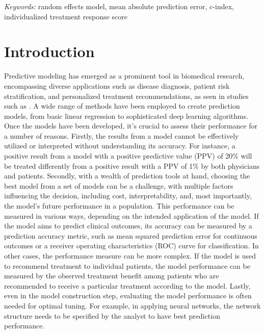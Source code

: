 \documentclass[12pt]{article}
\begin{document}
\noindent%
{\it Keywords:} %
random effects model, mean absolute prediction error, c-index, individualized treatment response score
\vfill

\newpage
{} %
\section{Introduction}

Predictive modeling has emerged as a prominent tool in biomedical research, encompassing diverse applications such as disease diagnosis, patient risk stratification, and personalized treatment recommendations, as seen in studies such as \cite{sullivan2004presentation, hemann2007framingham, solomon2006renal, krittanawong2017artificial}. A wide range of methods have been employed to create prediction models, from basic linear regression to sophisticated deep learning algorithms. Once the models have been developed, it's crucial to assess their performance for a number of reasons. Firstly, the results from a model cannot be effectively utilized or interpreted without understanding its accuracy. For instance, a positive result from a model with a positive predictive value (PPV) of 20\% will be treated differently from a positive result with a PPV of 1\% by both physicians and patients. Secondly, with a wealth of prediction tools at hand, choosing the best model from a set of models can be a challenge, with multiple factors influencing the decision, including cost, interpretability, and, most importantly, the model's future performance in a population. This performance can be measured in various ways, depending on the intended application of the model. If the model aims to predict clinical outcomes, its accuracy can be measured by a prediction accuracy metric, such as mean squared prediction error for continuous outcomes or a receiver operating characteristics (ROC) curve for classification. In other cases, the performance measure can be more complex. If the model is used to recommend treatment to individual patients, the model performance can be measured by the observed treatment benefit among patients who are recommended to receive a particular treatment according to the model. Lastly, even in the model construction step, evaluating the model performance is often needed for optimal tuning. For example, in applying neural networks, the network structure needs to be specified by the analyst to have best prediction performance. 
\end{document}
